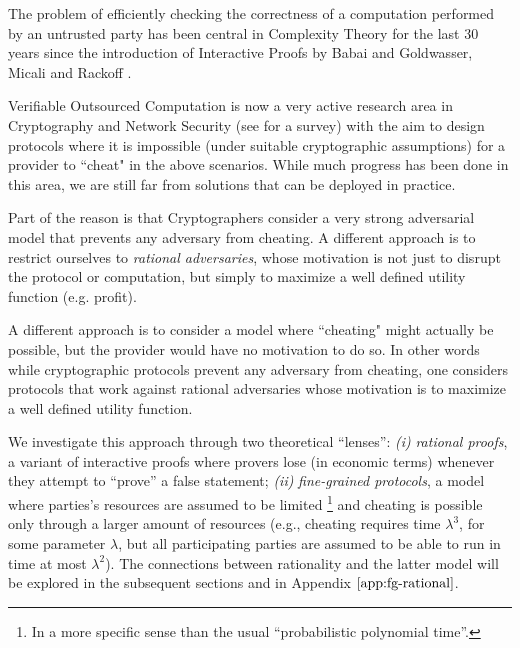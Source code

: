 

The problem of efficiently checking the correctness of a computation performed by an untrusted party has been central in Complexity Theory for the last 30 years since the introduction of Interactive Proofs by Babai and Goldwasser, Micali and Rackoff \cite{babai,gmr}. 

{\sf Verifiable Outsourced Computation} is now a very active research area in Cryptography and Network Security (see \cite{wb15} for a survey) with the aim to design protocols where it is impossible (under suitable cryptographic assumptions) for a provider to ``cheat" in the above scenarios. While much progress has been done in this area, we are still far from solutions that can be deployed in practice. 

Part of the reason is that Cryptographers consider a very strong adversarial model that prevents {\sf any} adversary from cheating. A different approach is to restrict ourselves to {\em rational adversaries}, whose motivation is not just to disrupt the protocol or computation, but simply to maximize a well defined utility function (e.g. profit).

A different approach is to consider a model where ``cheating" might actually be possible, but the provider would have no motivation to do so. In other words while cryptographic protocols prevent {\sf any} adversary from cheating, one considers protocols that work against {\sf rational} adversaries whose motivation is to maximize a well defined utility function. 

We investigate this approach through two theoretical ``lenses'': \textit{(i)} \textit{rational proofs}, a variant of interactive proofs where provers lose (in economic terms) whenever they attempt to ``prove'' a false statement; \textit{(ii)} \textit{fine-grained protocols}, a model where parties's resources are assumed to be limited \footnote{In a more specific sense than the usual ``probabilistic polynomial time''.} and cheating is possible only through a larger amount of resources (e.g., cheating requires time $\lambda^3$, for some parameter $\lambda$, but all participating parties are assumed to be able to run in time at most $\lambda^2$). The connections between rationality and the latter model will be explored in the subsequent sections and in Appendix $\ref{app:fg-rational}$.


